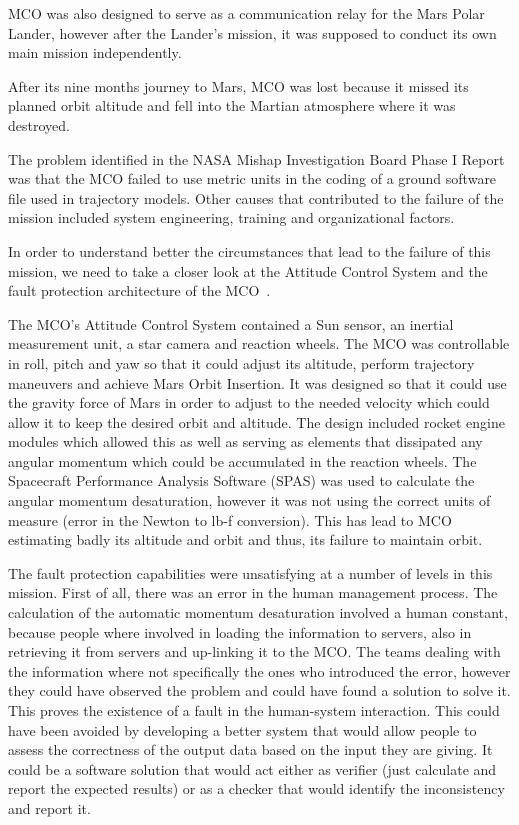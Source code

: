 MCO was also designed to serve as a communication relay for the Mars Polar
Lander, however after the Lander's mission, it was supposed to conduct its own
main mission independently.

After its nine months journey to Mars, MCO was lost because it missed its planned
orbit altitude and fell into the Martian atmosphere where it was destroyed.

The problem identified in the NASA Mishap Investigation Board Phase I
Report~\cite{mco-rep} was that the MCO failed to use metric units in the coding
of a ground software file used in trajectory models. Other causes that
contributed to the failure of the mission included system engineering, training
and organizational factors.

In order to understand better the circumstances that lead to the failure of this
mission, we need to take a closer look at the Attitude Control System and the
fault protection architecture of the MCO~\cite{surv-nasa-mars}.

The MCO's Attitude Control System contained a Sun sensor, an inertial
measurement unit, a star camera and reaction wheels. The MCO was controllable in
roll, pitch and yaw so that it could adjust its altitude, perform trajectory
maneuvers and achieve Mars Orbit Insertion. It was designed so that it could use
the gravity force of Mars in order to adjust to the needed velocity which could
allow it to keep the desired orbit and altitude. The design included rocket
engine modules which allowed this as well as serving as elements that dissipated
any angular momentum which could be accumulated in the reaction wheels. The
Spacecraft Performance Analysis Software (SPAS) was used to calculate the
angular momentum desaturation, however it was not using the correct units of
measure (error in the Newton to lb-f conversion). This has lead to MCO
estimating badly its altitude and orbit and thus, its failure to maintain
orbit.

The fault protection capabilities were unsatisfying at a number of levels in
this mission. First of all, there was an error in the human management process.
The calculation of the automatic momentum desaturation involved a human
constant, because people where involved in loading the information to servers,
also in retrieving it from servers and up-linking it to the MCO. The teams
dealing with the information where not specifically the ones who introduced the
error, however they could have observed the problem and could have found a
solution to solve it. This proves the existence of a fault in the human-system
interaction. This could have been avoided by developing a better system that
would allow people to assess the correctness of the output data based on the
input they are giving. It could be a software solution that would act either as
verifier (just calculate and report the expected results) or as a checker that
would identify the inconsistency and report it.

